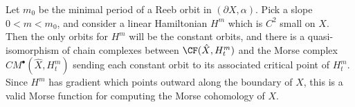 
 
    Let $m_0$ be the minimal period of a Reeb orbit in $(\partial X, \alpha)$. Pick a slope $0< m< m_0$, and consider a linear Hamiltonian $H^m$ which is $C^2$ small on $X$. Then the only orbits for $H^m$ will be the constant orbits, and there is a quasi-isomorphism of chain complexes between $\CF(\hat X, H^m_t)$ and the Morse complex $CM^\bullet(\hat X, H^m_t)$ sending each constant orbit to its associated critical point of $H^m_t$. Since $H^m$ has gradient which points outward along the boundary of $X$, this is a valid Morse function for computing the Morse cohomology of $X$.
 